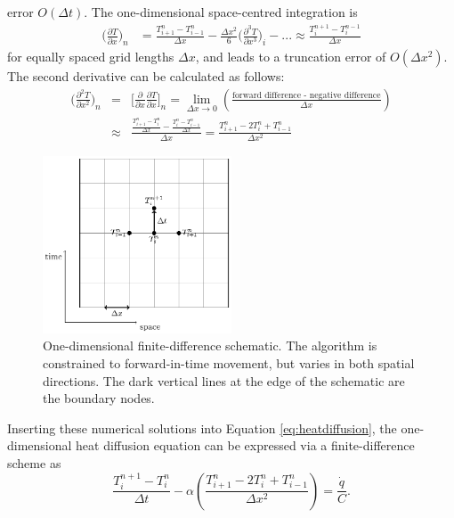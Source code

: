 error $O(\Delta t)$. The one-dimensional space-centred integration 
is
\begin{align}
\bigg(\frac{\partial T}{\partial x}\bigg)_n &= \frac{T_{i+1}^{n} - T_{i-1}^{n}}{\Delta x} - \frac{\Delta x^2}{6}\bigg(\frac{\partial^3 T}{\partial x^3}\bigg)_i - ... \approx \frac{T_{i}^{n+1} - T_{i}^{n-1}}{\Delta x} 
\end{align}
for equally spaced grid lengths $\Delta x$, and leads to a truncation 
error of $O(\Delta x^2)$. The second derivative can be calculated 
as follows:
\begin{align}
\bigg(\frac{\partial^2 T}{\partial x^2}\bigg)_n &=& \bigg[ \frac{\partial}{\partial x} \frac{\partial T}{\partial x}\bigg]_n = \lim\limits_{\Delta x \to 0} \left(\frac{\text{forward difference - negative difference}}{\Delta x}\right) \\
                                                                      &\approx& \frac{\frac{T_{i+1}^{n} - T_{i}^n}{\Delta x} - \frac{T_{i}^{n} - T_{i-1}^{n}}{\Delta x} }{\Delta x} = \frac{T_{i+1}^{n} - 2T_{i}^n + T_{i-1}^{n}}{\Delta x^2}
\end{align}
\begin{figure}[h]
	\centering
	\includegraphics[width=0.5\textwidth]{finitediff}
	\caption{One-dimensional finite-difference schematic. The algorithm is constrained to forward-in-time movement, but varies in both spatial directions. The dark vertical lines at the edge of the schematic are the boundary nodes.}
	\label{fig:1DFD}
\end{figure}
Inserting these numerical solutions into Equation \ref{eq:heatdiffusion}, 
the one-dimensional heat diffusion equation can be expressed via a 
finite-difference scheme as
\begin{equation}
\frac{T_{i}^{n+1} - T_{i}^n}{\Delta t} - \alpha \left(\frac{T_{i+1}^{n} - 2T_{i}^n + T_{i-1}^{n}}{\Delta x^2}\right) = \frac{\dot{q}}{C}.
\end{equation}
